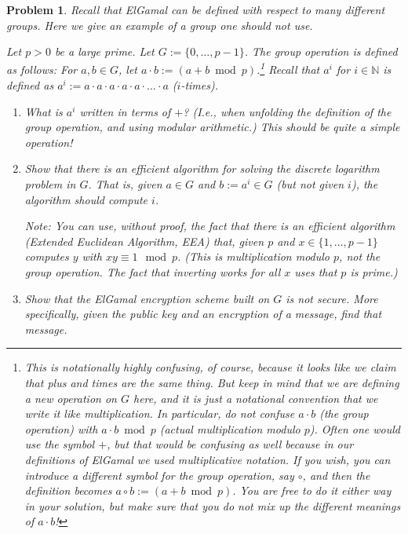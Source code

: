 \documentclass{../homework}
\newtheorem{problem}{Problem}
\begin{document}
\begin{problem}
    Recall that ElGamal can be defined with respect to many different groups.
    Here we give an example of a group one should not use.
    
    Let $p>0$ be a large prime. Let $G:=\{0,\dots,p-1\}$. The group operation is
    defined as follows: For $a,b\in G$, let $a\cdot b:=(a+b\bmod p)$.\footnote{%
    This is notationally highly confusing, of course, because it looks like we
    claim that plus and times are the same thing. But keep in mind that we are
    defining a new operation on $G$ here, and it is just a notational convention
    that we write it like multiplication. In particular, do not confuse $a\cdot
    b$ (the group operation) with $a\cdot b\bmod p$ (actual multiplication
    modulo $p$). Often one would use the symbol $+$, but that would be confusing
    as well because in our definitions of ElGamal we used multiplicative
    notation. If you wish, you can introduce a different symbol for the group
    operation, say $\circ$, and then the definition becomes $a\circ b:=(a+b\bmod
    p)$. You are free to do it either way in your solution, but make sure that
    you do not mix up the different meanings of $a\cdot b$!}
    Recall that $a^i$ for $i\in\mathbb{N}$ is defined as
    $a^i:=a\cdot a\cdot a\cdot a\cdot a\cdot \dots\cdot a$ ($i$-times).
    \begin{enumerate}
    \item What is $a^i$ written in terms of $+$? (I.e., when unfolding the
    definition of the group operation, and using modular arithmetic.) This
    should be quite a simple operation!
     
    \item\label{dlog} Show that there is an efficient algorithm for solving the
    discrete logarithm problem in $G$. That is, given $a\in G$ and $b:=a^i\in G$
    (but not given $i$), the algorithm should compute $i$.
    
    Note: You can use, without proof, the fact that there is an efficient
    algorithm (Extended Euclidean Algorithm, EEA) that, given $p$ and
    $x\in\{1,\dots,p-1\}$ computes $y$ with $xy\equiv 1\mod p$. (This is
    multiplication modulo $p$, not the group operation. The fact that inverting
    works for all $x$ uses that $p$ is prime.)
    
    \item\label{breakelgamal} Show that the ElGamal encryption scheme built on
    $G$ is not secure. More specifically, given the public key and an encryption
    of a message, find that message. 
    \end{enumerate} 
\end{problem}
\end{document}
